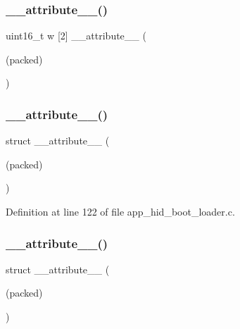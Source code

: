 \subsubsection{\texorpdfstring{\_\_attribute\_\_()}{\_\_attribute\_\_()}\hspace{0.1cm}{\footnotesize\ttfamily [1/3]}}
{\footnotesize\ttfamily uint16\+\_\+t w \mbox{[}2\mbox{]} \+\_\+\+\_\+attribute\+\_\+\+\_\+ (\begin{DoxyParamCaption}\item[{(packed)}]{ }\end{DoxyParamCaption})}

\mbox{\label{unionuint32__t___v_a_l_ab898071398b359603a35c202e9c65f3b}} 
\subsubsection{\texorpdfstring{\_\_attribute\_\_()}{\_\_attribute\_\_()}\hspace{0.1cm}{\footnotesize\ttfamily [2/3]}}
{\footnotesize\ttfamily struct \+\_\+\+\_\+attribute\+\_\+\+\_\+ (\begin{DoxyParamCaption}\item[{(packed)}]{ }\end{DoxyParamCaption})\hspace{0.3cm}{\ttfamily [inline]}}



Definition at line 122 of file app\+\_\+hid\+\_\+boot\+\_\+loader.\+c.

\mbox{\label{unionuint32__t___v_a_l_ab898071398b359603a35c202e9c65f3b}} 
\subsubsection{\texorpdfstring{\_\_attribute\_\_()}{\_\_attribute\_\_()}\hspace{0.1cm}{\footnotesize\ttfamily [3/3]}}
{\footnotesize\ttfamily struct \+\_\+\+\_\+attribute\+\_\+\+\_\+ (\begin{DoxyParamCaption}\item[{(packed)}]{ }\end{DoxyParamCaption})\hspace{0.3cm}{\ttfamily [inline]}}



